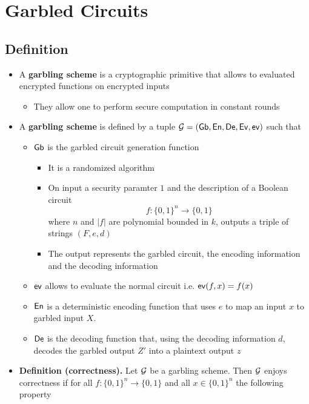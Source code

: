 \section{Garbled Circuits}
\localtableofcontents
\subsection{Definition}%
\begin{itemize}
    \item A \textbf{garbling scheme} is a cryptographic primitive that allows to evaluated encrypted functions on encrypted inputs
    \begin{itemize}
        \item They allow one to perform secure computation in constant rounds
    \end{itemize}
    \item A \textbf{garbling scheme} is defined by a tuple $\mathcal G = (\mathsf{Gb}, \mathsf{En}, \mathsf{De}, \mathsf{Ev}, \mathsf{ev})$ such that
    \begin{itemize}
        \item $\mathsf{Gb}$ is the garbled circuit generation function
        \begin{itemize}
            \item It is a randomized algorithm
            \item On input a security paramter $1$ and the description of a Boolean circuit
            \begin{equation*}
                f: \{0,1\}^n \to \{0,1\}
            \end{equation*}
            where $n$ and $|f|$ are polynomial bounded in $k$, outputs a triple of strings $(F,e,d)$
            \item The output represents the garbled circuit, the encoding information and the decoding information
        \end{itemize}
        \item $\mathsf{ev}$ allows to evaluate the normal circuit i.e. $\mathsf{ev}(f,x) = f(x)$
        \item $\mathsf{En}$ is a deterministic encoding function that uses $e$ to map an input $x$ to garbled input $X$. 
        \item $\mathsf{De}$ is the decoding function that, using the decoding information $d$, decodes the garbled output $Z'$ into a plaintext output $z$
    \end{itemize}
    \item \textbf{Definition (correctness).} Let $\mathcal G$ be a garbling scheme. Then $\mathcal G$ enjoys correctness if for all $f: \{0,1\}^n \to \{0,1\}$ and all $x \in \{0,1\}^n$ the following property

\end{itemize}
